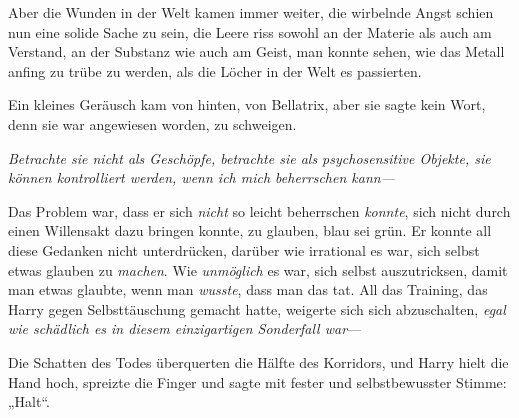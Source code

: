 Aber die Wunden in der Welt kamen immer weiter, die wirbelnde Angst schien nun eine solide Sache zu sein, die Leere riss sowohl an der Materie als auch am Verstand, an der Substanz wie auch am Geist, man konnte sehen, wie das Metall anfing zu trübe zu werden, als die Löcher in der Welt es passierten.

Ein kleines Geräusch kam von hinten, von Bellatrix, aber sie sagte kein Wort, denn sie war angewiesen worden, zu schweigen.

\emph{Betrachte sie nicht als Geschöpfe, betrachte sie als psychosensitive Objekte, sie können kontrolliert werden, wenn ich mich beherrschen kann—}

Das Problem war, dass er sich \emph{nicht} so leicht beherrschen \emph{konnte}, sich nicht durch einen Willensakt dazu bringen konnte, zu glauben, blau sei grün. Er konnte all diese Gedanken nicht unterdrücken, darüber wie irrational es war, sich selbst etwas glauben zu \emph{machen}. Wie \emph{unmöglich} es war, sich selbst auszutricksen, damit man etwas glaubte, wenn man \emph{wusste}, dass man das tat. All das Training, das Harry gegen Selbsttäuschung gemacht hatte, weigerte sich sich abzuschalten, \emph{egal wie schädlich es in diesem einzigartigen Sonderfall war}—

Die Schatten des Todes überquerten die Hälfte des Korridors, und Harry hielt die Hand hoch, spreizte die Finger und sagte mit fester und selbstbewusster Stimme: „Halt“.

